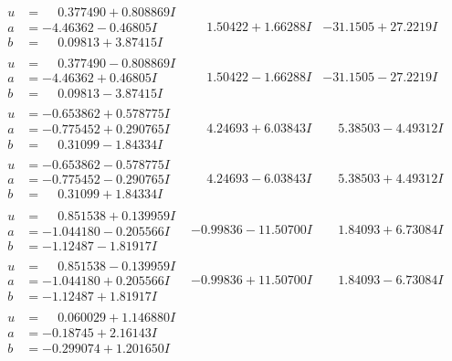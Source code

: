\documentclass[1p]{elsarticle_modified}
\theoremstyle{definition}
\begin{document}
$$\begin{array}{c|c|c}
\begin{aligned}
u &= \phantom{-}0.377490 + 0.808869 I \\
a &= -4.46362 - 0.46805 I \\
b &= \phantom{-}0.09813 + 3.87415 I\end{aligned}
 & \phantom{-}1.50422 + 1.66288 I & -31.1505 + 27.2219 I \\ \hline\begin{aligned}
u &= \phantom{-}0.377490 - 0.808869 I \\
a &= -4.46362 + 0.46805 I \\
b &= \phantom{-}0.09813 - 3.87415 I\end{aligned}
 & \phantom{-}1.50422 - 1.66288 I & -31.1505 - 27.2219 I \\ \hline\begin{aligned}
u &= -0.653862 + 0.578775 I \\
a &= -0.775452 + 0.290765 I \\
b &= \phantom{-}0.31099 - 1.84334 I\end{aligned}
 & \phantom{-}4.24693 + 6.03843 I & \phantom{-}5.38503 - 4.49312 I \\ \hline\begin{aligned}
u &= -0.653862 - 0.578775 I \\
a &= -0.775452 - 0.290765 I \\
b &= \phantom{-}0.31099 + 1.84334 I\end{aligned}
 & \phantom{-}4.24693 - 6.03843 I & \phantom{-}5.38503 + 4.49312 I \\ \hline\begin{aligned}
u &= \phantom{-}0.851538 + 0.139959 I \\
a &= -1.044180 - 0.205566 I \\
b &= -1.12487 - 1.81917 I\end{aligned}
 & -0.99836 - 11.50700 I & \phantom{-}1.84093 + 6.73084 I \\ \hline\begin{aligned}
u &= \phantom{-}0.851538 - 0.139959 I \\
a &= -1.044180 + 0.205566 I \\
b &= -1.12487 + 1.81917 I\end{aligned}
 & -0.99836 + 11.50700 I & \phantom{-}1.84093 - 6.73084 I \\ \hline\begin{aligned}
u &= \phantom{-}0.060029 + 1.146880 I \\
a &= -0.18745 + 2.16143 I \\
b &= -0.299074 + 1.201650 I\end{aligned}

\end{array}$$
\end{document}
